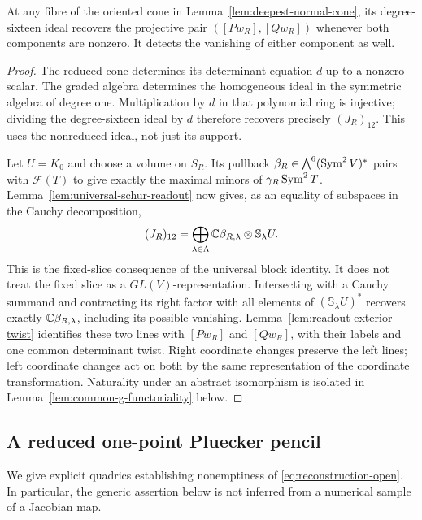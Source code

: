 \begin{lemma}
\label{lem:plucker-component-readout}
At any fibre of the oriented cone in
Lemma~\ref{lem:deepest-normal-cone}, its degree-sixteen ideal
recovers the projective pair \(([Pw_R],[Qw_R])\) whenever both
components are nonzero.  It detects the vanishing of either component
as well.
\end{lemma}
\begin{proof}
The reduced cone determines its determinant equation \(d\) up to a
nonzero scalar.  The graded algebra determines the homogeneous ideal
in the symmetric algebra of degree one.  Multiplication by \(d\)
in that polynomial ring is injective; dividing the degree-sixteen
ideal by \(d\) therefore recovers precisely \((J_R)_{12}\).
This uses the nonreduced ideal, not just its support.

Let \(U=K_0\) and choose a volume on \(S_R\).  Its pullback
\(\beta_R\in\bigwedge^6(\operatorname{Sym}^2V)^*\) pairs with
\(\mathcal F(T)\) to give exactly the maximal minors of
\(\gamma_R\operatorname{Sym}^2T\).  Lemma~\ref{lem:universal-schur-readout}
now gives, as an equality of subspaces in the Cauchy decomposition,
\begin{equation}\label{eq:minor-coefficient-readout}
 (J_R)_{12}=\bigoplus_{\lambda\in\Lambda}
       \mathbb C\beta_{R,\lambda}\otimes\mathbb S_\lambda U.
\end{equation}
This is the fixed-slice consequence of the universal block identity.
It does not treat the fixed slice as a \(GL(V)\)-representation.
Intersecting with a Cauchy summand and contracting its right factor
with all elements of \((\mathbb S_\lambda U)^*\) recovers exactly
\(\mathbb C\beta_{R,\lambda}\), including its possible vanishing.
Lemma~\ref{lem:readout-exterior-twist} identifies these two lines with
\([Pw_R]\) and \([Qw_R]\), with their labels and one common
determinant twist.  Right coordinate changes preserve the left lines;
left coordinate changes act on both by the same representation of the
coordinate transformation.  Naturality under an abstract isomorphism
is isolated in Lemma~\ref{lem:common-g-functoriality} below.
\end{proof}



\subsection{A reduced one-point Pluecker pencil}

We give explicit quadrics establishing nonemptiness of
\eqref{eq:reconstruction-open}.  In particular, the generic assertion
below is not inferred from a numerical sample of a Jacobian map.

